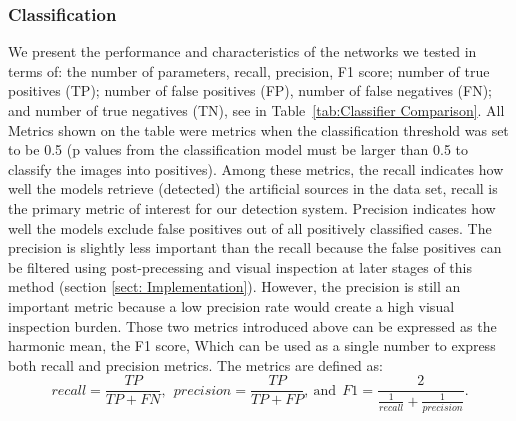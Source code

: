 \documentclass{aastex631}
\begin{document}
\subsubsection{Classification} 
\label{subsubsect: Classification}

We present the performance and characteristics of the networks we tested in terms of: the number of parameters, recall, precision, F1 score; number of true positives (TP); number of false positives (FP), number of false negatives (FN); and number of true negatives (TN), see in Table~\ref{tab:Classifier Comparison}.
All Metrics shown on the table were metrics when the classification threshold was set to be 0.5 (p values from the classification model must be larger than 0.5 to classify the images into positives).
Among these metrics, the recall indicates how well the models retrieve (detected) the artificial sources in the data set, recall is the primary metric of interest for our detection system.
Precision indicates how well the models exclude false positives out of all positively classified cases.
The precision is slightly less important than the recall because the false positives can be filtered using post-precessing and visual inspection at later stages of this method (section \ref{sect: Implementation}).
However, the precision is still an  important metric because a low precision rate would create a high visual inspection burden. 
Those two metrics introduced above can be expressed as the harmonic mean, the F1 score,
Which can be used as a single number to express both recall and precision metrics. The metrics are defined as:\\
\begin{equation}
    \label{eq:rpf}
    recall = \frac{TP}{TP+FN},\:\:precision=\frac{TP}{TP+FP},\:\textrm{and}\:\:F1 = \frac{2}{\frac{1}{recall}+\frac{1}{precision}}.
\end{equation}
\end{document}
